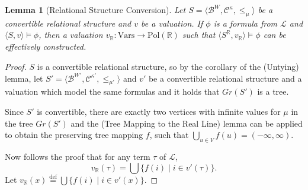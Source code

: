\documentclass{article}
\newtheorem*{lemma}{Lemma}
\newcommand{\R}{\mathbb{R}}
\newcommand{\B}{\mathcal{B}}
\newcommand{\lang}{\mathcal{L}}
\newcommand{\Vars}{\text{Vars}}
\newcommand{\Pol}{\text{Pol}}
\newcommand{\eqdef}{\stackrel{\text{def}}{=}}
\begin{document}
\begin{lemma}[Relational Structure Conversion]
  Let $S = \langle \B^W, \mathcal{C}^\kappa, \leq_\mu \rangle$ be a convertible relational structure and $v$ be a valuation. If $\phi$ is a formula from $\lang$ and $\langle S, v \rangle \models \phi$, then a valuation $v_\R: \Vars \rightarrow \Pol(\R)$ such that $\langle S^\R, v_\R \rangle \models \phi$ can be effectively constructed.
\end{lemma}
\begin{proof}
  $S$ is a convertible relational structure, so by the corollary of the (Untying) lemma, let $S' = \langle \B^{W'}, \mathcal{C}^{\kappa'}, \leq_{\mu'} \rangle$ and $v'$ be a convertible relational structure and a valuation which model the same formulas and it holds that $Gr(S')$ is a tree.

  Since $S'$ is convertible, there are exactly two vertices with infinite values for $\mu$ in the tree $Gr(S')$ and the (Tree Mapping to the Real Line) lemma can be applied to obtain the preserving tree mapping $f$, such that $\bigcup_{u \in V}f(u) = (-\infty, \infty)$.

  Now follows the proof that for any term $\tau$ of $\lang$, \[v_\R(\tau) = \bigcup\{ f(i) \mid i \in v'(\tau)\}.\] Let $v_\R(x) \eqdef \bigcup\{ f(i) \mid i \in v'(x) \}$.


\end{proof}
\end{document}
